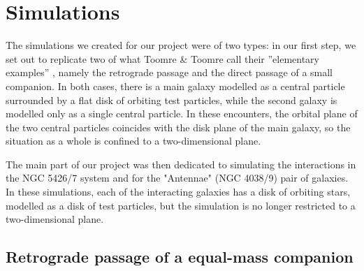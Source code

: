 \documentclass[11pt,twocolumn]{article}
\begin{document}

\section{Simulations} \label{simulations}
    
The simulations we created for our project were of two types: in our first step, we set out to replicate two of what Toomre \& Toomre call their  ''elementary examples'' \cite[section II]{toomre1972galactic}, namely the retrograde passage and the direct passage of a small companion. In both cases, there is a main galaxy modelled as a central particle surrounded by a flat disk of orbiting test particles, while the second galaxy is modelled only as a single central particle. In these encounters, the orbital plane of the two central particles coincides with the disk plane of the main galaxy, so the situation as a whole is confined to a two-dimensional plane.

The main part of our project was then dedicated to simulating the interactions in the NGC 5426/7 system and for the "Antennae" (NGC 4038/9) pair of galaxies. In these simulations, each of the interacting galaxies has a disk of orbiting stars, modelled as a disk of test particles, but the simulation is no longer restricted to a two-dimensional plane.
    
        
        
        \subsection{Retrograde passage of a equal-mass companion}
\end{document}
